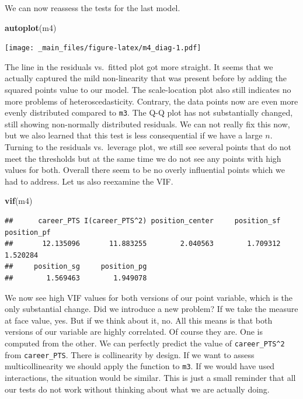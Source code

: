 \documentclass[
]{book}
\newenvironment{Shaded}{\begin{snugshade}}{\end{snugshade}}
\newcommand{\FunctionTok}[1]{\textcolor[rgb]{0.13,0.29,0.53}{\textbf{#1}}}
\newcommand{\NormalTok}[1]{#1}
\begin{document}
We can now reassess the tests for the last model.

\begin{Shaded}
\begin{Highlighting}[]
\FunctionTok{autoplot}\NormalTok{(m4)}
\end{Highlighting}
\end{Shaded}

\texttt{[image: \_main\_files/figure-latex/m4\_diag-1.pdf]}

The line in the residuals vs.~fitted plot got more straight. It seems
that we actually captured the mild non-linearity that was present before
by adding the squared points value to our model. The scale-location plot
also still indicates no more problems of heteroscedasticity. Contrary,
the data points now are even more evenly distributed compared to \texttt{m3}.
The Q-Q plot has not substantially changed, still showing non-normally
distributed residuals. We can not really fix this now, but we also
learned that this test is less consequential if we have a large \(n\).
Turning to the residuals vs.~leverage plot, we still see several points
that do not meet the thresholds but at the same time we do not see any
points with high values for both. Overall there seem to be no overly
influential points which we had to address. Let us also reexamine the
VIF.

\begin{Shaded}
\begin{Highlighting}[]
\FunctionTok{vif}\NormalTok{(m4)}
\end{Highlighting}
\end{Shaded}

\begin{verbatim}
##      career_PTS I(career_PTS^2) position_center     position_sf     position_pf 
##       12.135096       11.883255        2.040563        1.709312        1.520284 
##     position_sg     position_pg 
##        1.569463        1.949078
\end{verbatim}

We now see high VIF values for both versions of our point variable,
which is the only substantial change. Did we introduce a new problem? If
we take the measure at face value, yes. But if we think about it, no.
All this means is that both versions of our variable are highly
correlated. Of course they are. One is computed from the other. We can
perfectly predict the value of \texttt{career\_PTS\^{}2} from \texttt{career\_PTS}. There
is collinearity by design. If we want to assess multicollinearity we
should apply the function to \texttt{m3}. If we would have used interactions,
the situation would be similar. This is just a small reminder that all
our tests do not work without thinking about what we are actually doing.
\end{document}
